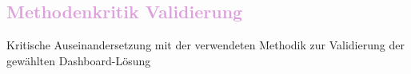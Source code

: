 \subsection{\textcolor{Plum}{Methodenkritik Validierung}}
Kritische Auseinandersetzung mit der verwendeten Methodik zur Validierung der gewählten Dashboard-Lösung

